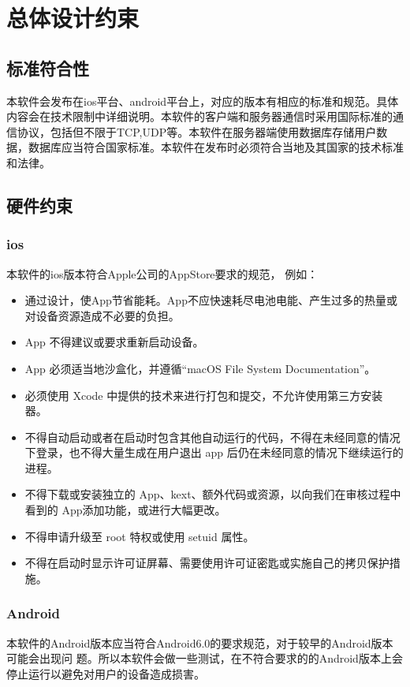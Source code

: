 \chapter{总体设计约束}
\section{标准符合性}
本软件会发布在ios平台、android平台上，对应的版本有相应的标准和规范。具体内容会在技术限制中详细说明。本软件的客户端和服务器通信时采用国际标准的通信协议，包括但不限于TCP,UDP等。本软件在服务器端使用数据库存储用户数据，数据库应当符合国家标准。本软件在发布时必须符合当地及其国家的技术标准和法律。

\section{硬件约束}
\subsection{ios}
本软件的ios版本符合Apple公司的AppStore要求的规范，
例如：
\begin{itemize}
  \item 通过设计，使App节省能耗。App不应快速耗尽电池电能、产生过多的热量或对设备资源造成不必要的负担。
  \item App 不得建议或要求重新启动设备。
  \item App 必须适当地沙盒化，并遵循“macOS File System Documentation”。
  \item 必须使用 Xcode 中提供的技术来进行打包和提交，不允许使用第三方安装器。
  \item 不得自动启动或者在启动时包含其他自动运行的代码，不得在未经同意的情况下登录，也不得大量生成在用户退出 app 后仍在未经同意的情况下继续运行的进程。
  \item 不得下载或安装独立的 App、kext、额外代码或资源，以向我们在审核过程中看到的 App添加功能，或进行大幅更改。
  \item 不得申请升级至 root 特权或使用 setuid 属性。
  \item 不得在启动时显示许可证屏幕、需要使用许可证密匙或实施自己的拷贝保护措施。
\end{itemize}

\subsection{Android}
本软件的Android版本应当符合Android6.0的要求规范，对于较早的Android版本可能会出现问
题。所以本软件会做一些测试，在不符合要求的的Android版本上会停止运行以避免对用户的设备造成损害。


